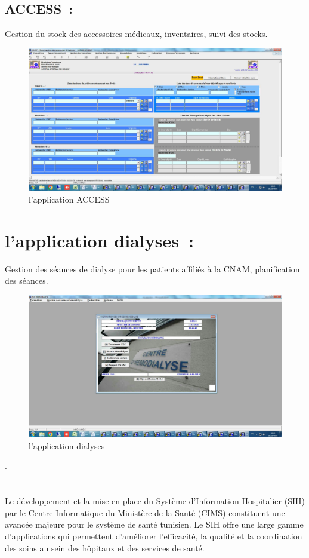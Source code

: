 \documentclass[12pt]{rapportINPTCLOUD}
\begin{document}
\subsection{ACCESS :} Gestion du stock des accessoires médicaux, inventaires, suivi des stocks.
\begin{figure}[H]
	\centering
	\includegraphics[width=1\linewidth]{img/n.jpg}
	\caption{l'application ACCESS}
	\label{fig:ACCESS}
\end{figure}

 

	\section{\textcolor{sectioncolor}{l'application dialyses :}}

Gestion des séances de dialyse pour les patients affiliés à la CNAM, planification des séances.

\begin{figure}[H]
	\centering
	\includegraphics[width=1\linewidth]{img/o.jpg}
	\caption{l'application dialyses}
	\label{fig:dialyses}
\end{figure}
.\\ \\ \\ 
Le développement et la mise en place du Système d'Information Hospitalier (SIH) par le Centre Informatique du Ministère de la Santé (CIMS) constituent une avancée majeure pour le système de santé tunisien. Le SIH offre une large gamme d'applications qui permettent d'améliorer l'efficacité, la qualité et la coordination des soins au sein des hôpitaux et des services de santé.
\end{document}
